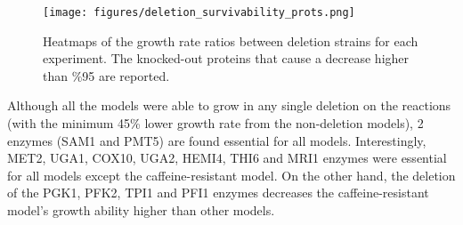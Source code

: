 \begin{figure}[H]
  \begin{center}
  \texttt{[image: figures/deletion\_survivability\_prots.png]}
  \caption[Heatmaps of the growth rate ratios between deletion strains for each experiment. The knocked-out proteins that cause a decrease higher than \%95 are reported.]{Heatmaps of the growth rate ratios between deletion strains for each experiment. The knocked-out proteins that cause a decrease higher than \%95 are reported.}
  \label{fig:deletion_survivability_prots}
  \end{center}
\end{figure}

Although all the models were able to grow in any single deletion on the reactions (with the minimum 45\% lower growth rate from the non-deletion models), 2 enzymes (SAM1 and PMT5) are found essential for all models. Interestingly, MET2, UGA1, COX10, UGA2, HEMI4, THI6 and MRI1 enzymes were essential for all models except the caffeine-resistant model. On the other hand, the deletion of the PGK1, PFK2, TPI1 and PFI1 enzymes decreases the caffeine-resistant model's growth ability higher than other models.
